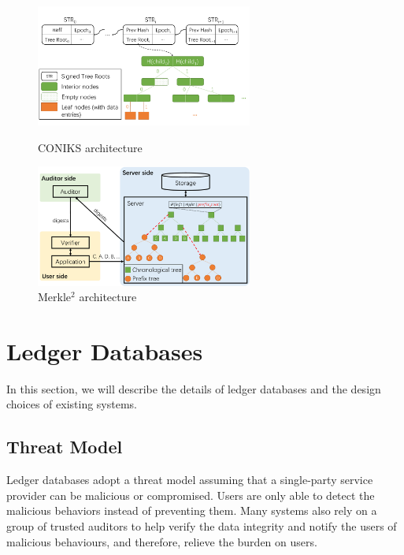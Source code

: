 \documentclass[11pt,dvipdfm]{article}
\begin{document}
\begin{figure}[t]
    \centering
    \begin{minipage}{0.48\textwidth}
        \centering
        \includegraphics[height=4cm]{figs/arch_conkis.pdf}
        \caption{CONIKS architecture}
        \label{fig:conkis}
    \end{minipage}
    \begin{minipage}{0.48\textwidth}
        \centering
        \includegraphics[height=4cm]{figs/arch_merkle2.pdf}
        \caption{Merkle$^2$ architecture}
        \label{fig:merkle2}
    \end{minipage}
\end{figure}

\section{Ledger Databases}
\label{sec:ldb}

In this section, we will describe the details of ledger databases and the design choices of existing systems.

\subsection{Threat Model}

Ledger databases adopt a threat model assuming that a single-party service provider can be malicious or compromised.
Users are only able to detect the malicious behaviors instead of preventing them. 
Many systems also rely on a group of trusted auditors to help verify the data integrity and notify the users of malicious behaviours, and therefore, relieve the burden on users.
\end{document}
